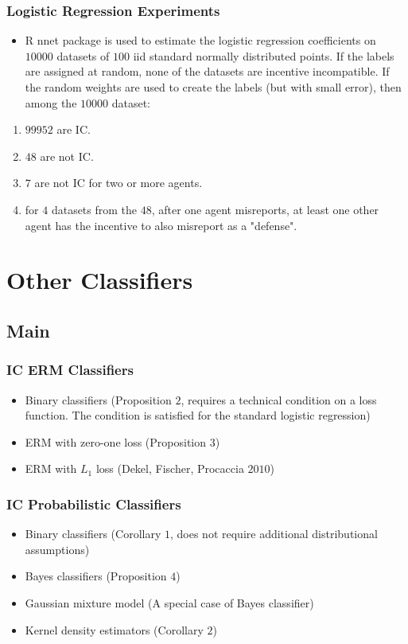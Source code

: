 \documentclass{beamer}
\begin{document}
\begin{frame} \frametitle{Logistic Regression Experiments}
\begin{itemize}
\item R nnet package is used to estimate the logistic regression coefficients on $10000$ datasets of $100$ iid standard normally distributed points. If the labels are assigned at random, none of the datasets are incentive incompatible. If the random weights are used to create the labels (but with small error), then among the $10000$ dataset:
\end{itemize}
\begin{enumerate}
\item $99952$ are IC.
\item $48$ are not IC.
\item $7$ are not IC for two or more agents.
\item for $4$ datasets from the $48$, after one agent misreports, at least one other agent has the incentive to also misreport as a "defense".
\end{enumerate}

\end{frame}



\section{Other Classifiers} \subsection{Main}

\begin{frame} \frametitle{IC ERM Classifiers}
\begin{itemize}
\item Binary classifiers (Proposition $2$, requires a technical condition on a loss function. The condition is satisfied for the standard logistic regression)
\item ERM with zero-one loss (Proposition $3$)
\item ERM with $L_{1}$ loss (Dekel, Fischer, Procaccia $2010$)
\end{itemize}
\end{frame}

\begin{frame} \frametitle{IC Probabilistic Classifiers}
\begin{itemize}
\item Binary classifiers (Corollary $1$, does not require additional distributional assumptions)
\item Bayes classifiers (Proposition $4$)
\item Gaussian mixture model (A special case of Bayes classifier)
\item Kernel density estimators (Corollary $2$)
\end{itemize}
\end{frame}
\end{document}
